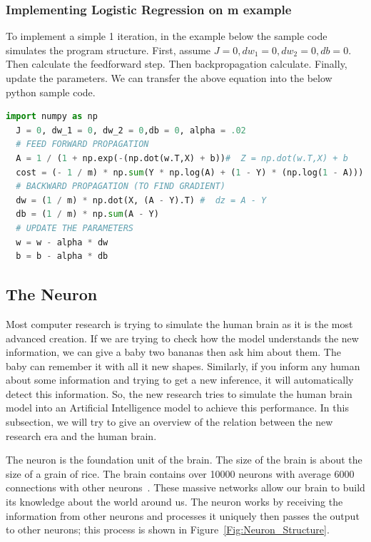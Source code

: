 \subsubsection{Implementing Logistic Regression on m example}
To implement a simple 1 iteration, in the example below the sample code simulates the program structure. First, assume $J = 0, dw_1 = 0, dw_2 = 0,db = 0$. Then calculate the feedforward step. Then backpropagation calculate. Finally, update the parameters. We can transfer the above equation into the below python sample code.%
 \begin{lstlisting}[language=Python]
  import numpy as np
  J = 0, dw_1 = 0, dw_2 = 0,db = 0, alpha = .02
  # FEED FORWARD PROPAGATION
  A = 1 / (1 + np.exp(-(np.dot(w.T,X) + b))#  Z = np.dot(w.T,X) + b
  cost = (- 1 / m) * np.sum(Y * np.log(A) + (1 - Y) * (np.log(1 - A)))
  # BACKWARD PROPAGATION (TO FIND GRADIENT)
  dw = (1 / m) * np.dot(X, (A - Y).T) #  dz = A - Y
  db = (1 / m) * np.sum(A - Y)
  # UPDATE THE PARAMETERS
  w = w - alpha * dw
  b = b - alpha * db
 \end{lstlisting}%
%
\subsection{The Neuron}

Most computer research is trying to simulate the human brain as it is the most advanced creation. If we are trying to check how the model understands the new information, we can give a baby two bananas then ask him about them. The baby can remember it with all it new shapes. Similarly, if you inform any human about some information and trying to get a new inference, it will automatically detect this information. So, the new research tries to simulate the human brain model into an Artificial Intelligence model to achieve this performance. In this subsection, we will try to give an overview of the relation between the new research era and the human brain.
 
The neuron is the foundation unit of the brain. The size of the brain is about the size of a grain of rice. The brain contains over 10000 neurons with average 6000 connections with other neurons~\cite{Restak_2001}.  These massive networks allow our brain to build its knowledge about the world around us. The neuron works by receiving the information from other neurons and processes it uniquely then passes the output to other neurons; this process is shown in Figure~\ref{Fig:Neuron_Structure}.%

